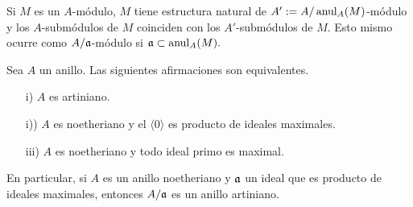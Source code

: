 \documentclass[../main.tex]{subfiles}
\begin{document}
\begin{remark}
Si $M$ es un $A$-módulo, $M$ tiene estructura natural de $A':=A/\operatorname{anul}_A(M)$-módulo y los $A$-submódulos de $M$ coinciden con los $A'$-submódulos de $M.$ Esto mismo ocurre como $A/\mathfrak{a}$-módulo si $\mathfrak{a}\subset\operatorname{anul}_A(M).$
\end{remark}

\begin{proposition}
Sea $A$ un anillo. Las siguientes afirmaciones son equivalentes.
\begin{itemize}
    \item[i)] $A$ es artiniano.
    \item[i))] $A$ es noetheriano y el $\langle 0\rangle$ es producto de ideales maximales.
    \item[iii)] $A$ es noetheriano y todo ideal primo es maximal.
\end{itemize}
En particular, si $A$ es un anillo noetheriano y $\mathfrak{a}$ un ideal que es producto de ideales maximales, entonces $A/\mathfrak{a}$ es un anillo artiniano.
\end{proposition}
\end{document}
